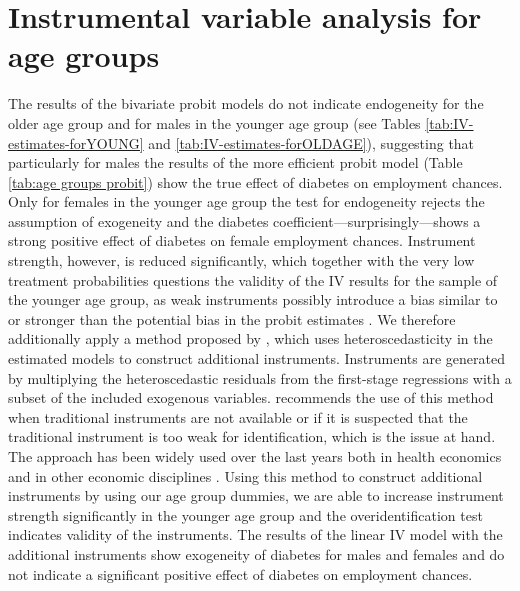 \clearpage


\section{Instrumental variable analysis for age groups}


The results of the bivariate probit models do not indicate
endogeneity for the older age group and for males in the younger age
group (see Tables \ref{tab:IV-estimates-forYOUNG} and \ref{tab:IV-estimates-forOLDAGE}),
suggesting that particularly for males the results of the more efficient
probit model (Table \ref{tab:age groups probit}) show the true effect
of diabetes on employment chances. Only for females in the younger
age group the test for endogeneity rejects the assumption of exogeneity
and the diabetes coefficient---surprisingly---shows a strong positive
effect of diabetes on female employment chances. Instrument strength,
however, is reduced significantly, which together with the very low
treatment probabilities questions the validity of the \ac{IV} results
for the sample of the younger age group, as weak instruments possibly
introduce a bias similar to or stronger than the potential bias in
the probit estimates \parencite{Staiger1997}. We therefore additionally
apply a method proposed by \textcite{Lewbel2012}, which uses heteroscedasticity
in the estimated models to construct additional instruments. Instruments
are generated by multiplying the heteroscedastic residuals from the
first-stage regressions with a subset of the included exogenous variables.
\textcite{Lewbel2012} recommends the use of this method when traditional
instruments are not available or if it is suspected that the traditional
instrument is too weak for identification, which is the issue at hand.
The approach has been widely used over the last years both in health
economics \parencite{Drichoutis2011,Kelly2012,Schroeter2012,Brown2014}
and in other economic disciplines \parencite{Huang2009a,Emran2012,Denny2013}.
Using this method to construct additional instruments by using our
age group dummies, we are able to increase instrument strength significantly
in the younger age group and the overidentification test indicates
validity of the instruments. The results of the linear \ac{IV} model
with the additional instruments show exogeneity of diabetes for males
and females and do not indicate a significant positive effect of diabetes
on employment chances.


